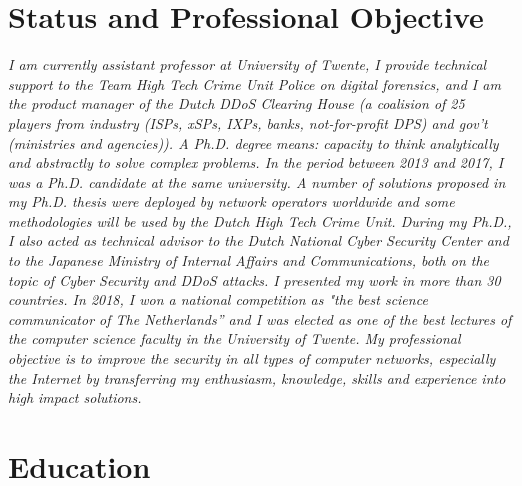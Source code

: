 \documentclass[print]{styles/friggeri-cv-linux} %
\begin{document}
\section{Status and Professional Objective}\vspace{-10pt}
\noindent\setlength\parindent{12pt}\textit{
	I am currently assistant professor at University of Twente, I provide technical support to the Team High Tech Crime Unit Police on digital forensics, and I am the product manager of the Dutch DDoS Clearing House (a coalision of 25 players from industry (ISPs, xSPs, IXPs, banks, not-for-profit DPS) and gov’t (ministries and agencies)).
	A Ph.D. degree means: capacity to think analytically and abstractly to solve complex problems. 
	In the period between 2013 and 2017, I was a Ph.D. candidate at the same university. A number of solutions proposed in my Ph.D. thesis were deployed by network operators worldwide and some methodologies will be used by the Dutch High Tech Crime Unit. During my Ph.D., I also acted as technical advisor to the Dutch National Cyber Security Center and to the Japanese Ministry of Internal Affairs and Communications, both on the topic of Cyber Security and DDoS attacks. 
	I presented my work in more than 30 countries. In 2018, I won a national competition as "the best science communicator of The Netherlands” and I was elected as one of the best lectures of the computer science faculty in the University of Twente.
	My professional objective is to improve the security in all types of computer networks, especially the Internet by transferring my enthusiasm, knowledge, skills and experience into high impact solutions. 
}



\setlength\parindent{0pt}
\section{Education}\vspace{-5pt}
\end{document}
